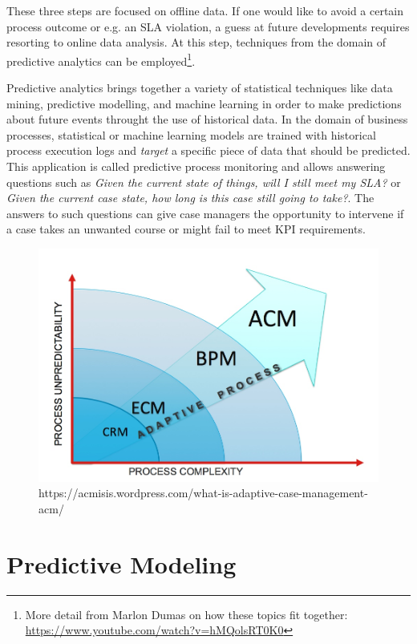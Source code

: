 These three steps are focused on offline data.
If one would like to avoid a certain process outcome  or e.g. an SLA violation, a guess at future developments requires resorting to online data analysis.
At this step, techniques from the domain of predictive analytics can be employed\footnote{More detail from Marlon Dumas on how these topics fit together: \url{https://www.youtube.com/watch?v=hMQolsRT0K0}}.

Predictive analytics brings together a variety of statistical techniques like data mining, predictive modelling, and machine learning in order to make predictions about future events throught the use of historical data.
In the domain of business processes, statistical or machine learning models are trained with historical process execution logs and \textit{target} a specific piece of data that should be predicted.
This application is called predictive process monitoring and allows answering questions such as \textit{Given the current state of things, will I still meet my SLA?} or \textit{Given the current case state, how long is this case still going to take?}.
The answers to such questions can give case managers the opportunity to intervene if a case takes an unwanted course or might fail to meet KPI requirements.


\begin{figure}
	\centering
	\includegraphics[width=\textwidth]{gfx/acm-reasoning}
	\caption{https://acmisis.wordpress.com/what-is-adaptive-case-management-acm/}
	\label{fig:why-acm}
\end{figure}

\section{Predictive Modeling}
